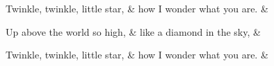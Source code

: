 \documentclass{article}
\begin{document}
\beginnumbering

\stanza[\emph{A}]
Twinkle, twinkle, little star, &
how I wonder what you are. \&

\stanza[\emph{B}]
Up above the world so high, &
like a diamond in the sky, \&

\stanza[\emph{A}]
Twinkle, twinkle, little star, \ledpb &
how I wonder what you are. \&

\endnumbering
\end{document}
